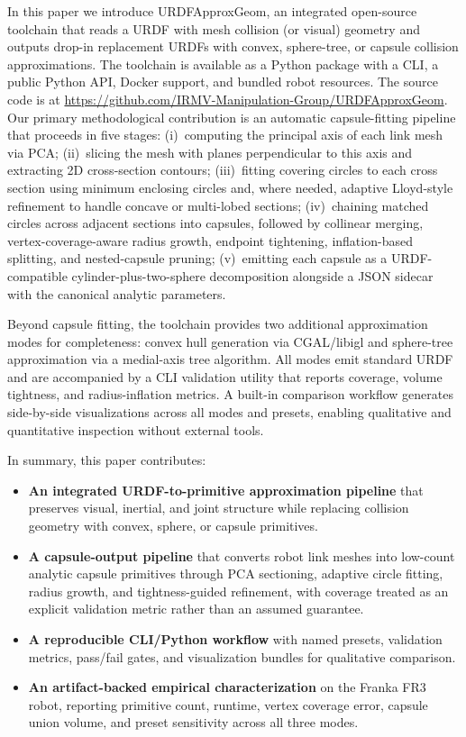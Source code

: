 In this paper we introduce URDFApproxGeom, an integrated open-source toolchain that reads a URDF with mesh collision (or visual) geometry and outputs drop-in replacement URDFs with convex, sphere-tree, or capsule collision approximations.
The toolchain is available as a Python package with a CLI, a public Python API, Docker support, and bundled robot resources. The source code is at \url{https://github.com/IRMV-Manipulation-Group/URDFApproxGeom}.
Our primary methodological contribution is an automatic capsule-fitting pipeline that proceeds in five stages:
(i)~computing the principal axis of each link mesh via PCA;
(ii)~slicing the mesh with planes perpendicular to this axis and extracting 2D cross-section contours;
(iii)~fitting covering circles to each cross section using minimum enclosing circles and, where needed, adaptive Lloyd-style refinement to handle concave or multi-lobed sections;
(iv)~chaining matched circles across adjacent sections into capsules, followed by collinear merging, vertex-coverage-aware radius growth, endpoint tightening, inflation-based splitting, and nested-capsule pruning;
(v)~emitting each capsule as a URDF-compatible cylinder-plus-two-sphere decomposition alongside a JSON sidecar with the canonical analytic parameters.

Beyond capsule fitting, the toolchain provides two additional approximation modes for completeness: convex hull generation via CGAL/libigl and sphere-tree approximation via a medial-axis tree algorithm.
All modes emit standard URDF and are accompanied by a CLI validation utility that reports coverage, volume tightness, and radius-inflation metrics.
A built-in comparison workflow generates side-by-side visualizations across all modes and presets, enabling qualitative and quantitative inspection without external tools.

In summary, this paper contributes:
\begin{itemize}
    \item \textbf{An integrated URDF-to-primitive approximation pipeline} that preserves visual, inertial, and joint structure while replacing collision geometry with convex, sphere, or capsule primitives.
    \item \textbf{A capsule-output pipeline} that converts robot link meshes into low-count analytic capsule primitives through PCA sectioning, adaptive circle fitting, radius growth, and tightness-guided refinement, with coverage treated as an explicit validation metric rather than an assumed guarantee.
    \item \textbf{A reproducible CLI/Python workflow} with named presets, validation metrics, pass/fail gates, and visualization bundles for qualitative comparison.
    \item \textbf{An artifact-backed empirical characterization} on the Franka FR3 robot, reporting primitive count, runtime, vertex coverage error, capsule union volume, and preset sensitivity across all three modes.
\end{itemize}

